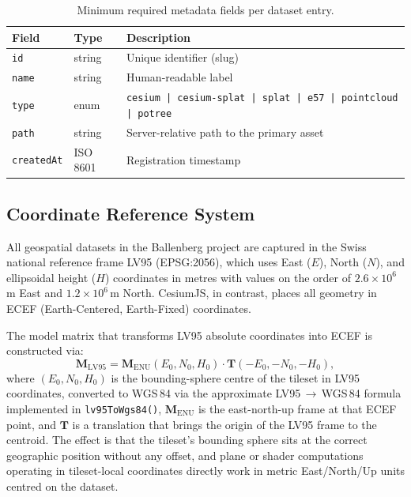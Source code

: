 \begin{table}[h]
\centering
\caption{Minimum required metadata fields per dataset entry.}
\label{tab:metadata_min}
\begin{tabular}{lll}
\toprule
\textbf{Field} & \textbf{Type} & \textbf{Description} \\
\midrule
\texttt{id}         & string    & Unique identifier (slug) \\
\texttt{name}       & string    & Human-readable label \\
\texttt{type}       & enum      & \texttt{cesium | cesium-splat | splat | e57 | pointcloud | potree} \\
\texttt{path}       & string    & Server-relative path to the primary asset \\
\texttt{createdAt}  & ISO 8601  & Registration timestamp \\
\bottomrule
\end{tabular}
\end{table}

\subsection{Coordinate Reference System}

All geospatial datasets in the Ballenberg project are captured in the Swiss
national reference frame LV95 (EPSG:2056), which uses East ($E$), North ($N$),
and ellipsoidal height ($H$) coordinates in metres with values on the order of
$2.6 \times 10^6$\,m East and $1.2 \times 10^6$\,m North. CesiumJS, in
contrast, places all geometry in ECEF (Earth-Centered, Earth-Fixed) coordinates.

The model matrix that transforms LV95 absolute coordinates into ECEF is
constructed via:
\begin{equation}
  \mathbf{M}_{\text{LV95}} = \mathbf{M}_{\text{ENU}}(E_0, N_0, H_0)
    \cdot \mathbf{T}(-E_0, -N_0, -H_0),
\end{equation}
where $(E_0, N_0, H_0)$ is the bounding-sphere centre of the tileset in
LV95 coordinates, converted to WGS\,84 via the approximate
LV95\,$\to$\,WGS\,84 formula implemented in \texttt{lv95ToWgs84()}, $\mathbf{M}_{\text{ENU}}$ is the
east-north-up frame at that ECEF point, and $\mathbf{T}$ is a translation
that brings the origin of the LV95 frame to the centroid. The effect is that
the tileset's bounding sphere sits at the correct geographic position without
any offset, and plane or shader computations operating in tileset-local
coordinates directly work in metric East/North/Up units centred on the
dataset.

